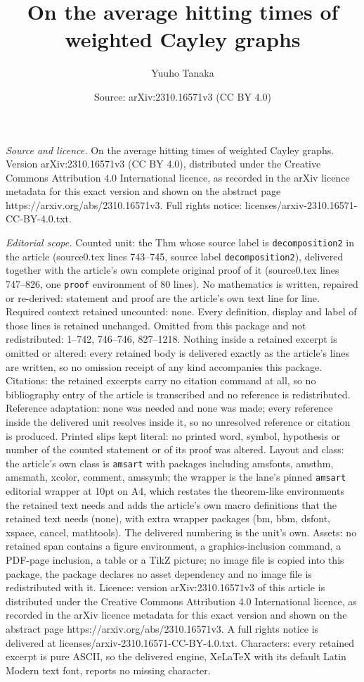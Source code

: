 \documentclass[10pt,a4paper]{amsart}
\title[On the average hitting times of weighted Cayley graphs]{On the average hitting times of weighted Cayley graphs}
\author{Yuuho Tanaka}
\date{Source: arXiv:2310.16571v3 (CC BY 4.0)}
\begin{document}
\maketitle

\noindent\emph{Source and licence.} On the average hitting times of weighted Cayley graphs. Version arXiv:2310.16571v3 (CC BY 4.0), distributed under the Creative Commons Attribution 4.0 International licence, as recorded in the arXiv licence metadata for this exact version and shown on the abstract page https://arxiv.org/abs/2310.16571v3. Full rights notice: licenses/arxiv-2310.16571-CC-BY-4.0.txt.\par\smallskip

\noindent\textit{Editorial scope.} Counted unit: the Thm whose source label is \texttt{decomposition2} in the article (source0.tex lines 743--745, source label \texttt{decomposition2}), delivered together with the article's own complete original proof of it (source0.tex lines 747--826, one \texttt{proof} environment of 80 lines). No mathematics is written, repaired or re-derived: statement and proof are the article's own text line for line. Required context retained uncounted: none. Every definition, display and label of those lines is retained unchanged. Omitted from this package and not redistributed: 1--742, 746--746, 827--1218. Nothing inside a retained excerpt is omitted or altered: every retained body is delivered exactly as the article's lines are written, so no omission receipt of any kind accompanies this package. Citations: the retained excerpts carry no citation command at all, so no bibliography entry of the article is transcribed and no reference is redistributed. Reference adaptation: none was needed and none was made; every reference inside the delivered unit resolves inside it, so no unresolved reference or citation is produced. Printed slips kept literal: no printed word, symbol, hypothesis or number of the counted statement or of its proof was altered. Layout and class: the article's own class is \texttt{amsart} with packages including amsfonts, amsthm, amsmath, xcolor, comment, amssymb; the wrapper is the lane's pinned \texttt{amsart} editorial wrapper at 10pt on A4, which restates the theorem-like environments the retained text needs and adds the article's own macro definitions that the retained text needs (none), with extra wrapper packages (bm, bbm, dsfont, xspace, cancel, mathtools). The delivered numbering is the unit's own. Assets: no retained span contains a figure environment, a graphics-inclusion command, a PDF-page inclusion, a table or a TikZ picture; no image file is copied into this package, the package declares no asset dependency and no image file is redistributed with it. Licence: version arXiv:2310.16571v3 of this article is distributed under the Creative Commons Attribution 4.0 International licence, as recorded in the arXiv licence metadata for this exact version and shown on the abstract page https://arxiv.org/abs/2310.16571v3. A full rights notice is delivered at licenses/arxiv-2310.16571-CC-BY-4.0.txt. Characters: every retained excerpt is pure ASCII, so the delivered engine, XeLaTeX with its default Latin Modern text font, reports no missing character.
\end{document}
